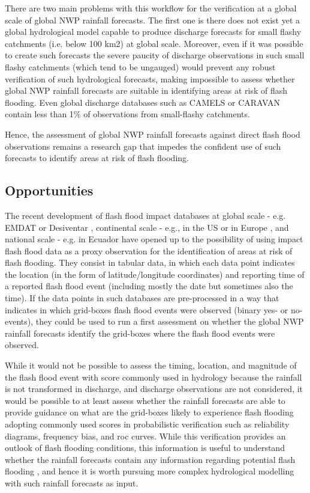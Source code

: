 There are two main problems with this workflow for the verification at a global scale of global NWP rainfall forecasts. The first one is there does not exist yet a global hydrological model capable to produce discharge forecasts for small flashy catchments (i.e. below 100 km2) at global scale. Moreover, even if it was possible to create such forecasts the severe paucity of discharge observations in such small flashy catchments (which tend to be ungauged) would prevent any robust verification of such hydrological forecasts, making impossible to assess whether global NWP rainfall forecasts are suitable in identifying areas at risk of flash flooding. Even global discharge databases such as CAMELS or CARAVAN \citep{Kratzert_2023} contain less than 1\% of observations from small-flashy catchments. 

Hence, the assessment of global NWP rainfall forecasts against direct flash flood observations
remains a research gap that impedes the confident use of such forecasts to identify areas at risk of flash flooding.

\subsection{Opportunities}

The recent development of flash flood impact databases at global scale - e.g. EMDAT or Desiventar \citep{cred_2019}, continental scale - e.g., in the US or in Europe \citep{noaa_2019}, and national scale - e.g. in Ecuador  \citep{Bucherie_2022a} have opened up to the possibility of using impact flash flood data as a proxy observation for the identification of areas at risk of flash flooding. They consist in tabular data, in which each data point indicates the location (in the form of latitude/longitude coordinates) and reporting time of a reported flash flood event (including mostly the date but sometimes also the time). If the data points in such databases are pre-processed in a way that indicates in which grid-boxes flash flood events were observed (binary yes- or no-events), they could be used to run a first assessment on whether the global NWP rainfall forecasts identify the grid-boxes where the flash flood events were observed.

While it would not be possible to assess the timing, location, and magnitude of the flash flood event with score commonly used in hydrology because the rainfall is not transformed in discharge, and discharge observations are not considered, it would be possible to at least assess whether the rainfall forecasts are able to provide guidance on what are the grid-boxes likely to experience flash flooding adopting commonly used scores in probabilistic verification such as reliability diagrams, frequency bias, and roc curves. While this verification provides an outlook of flash flooding conditions, this information is useful to understand whether the rainfall forecasts contain any information regarding potential flash flooding \citep{Mason_1979}, and hence it is worth pursuing more complex hydrological modelling with such rainfall forecasts as input. 

